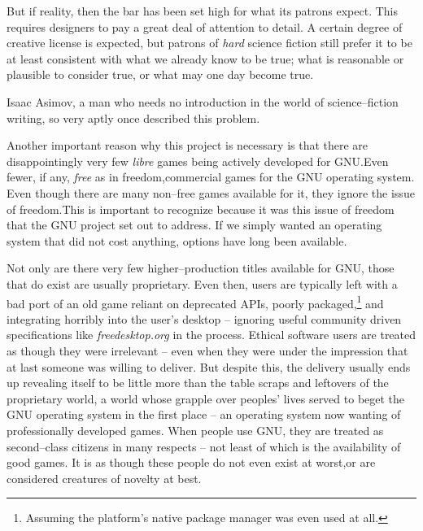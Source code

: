 But if reality, then the bar has been set high for what its patrons expect. This requires designers to pay a great deal of attention to detail. A certain degree of creative license is expected, but patrons of {\it hard} science fiction still prefer it to be at least consistent with what we already know to be true; what is reasonable or plausible to consider true, or what may one day become true.

Isaac Asimov, a man who needs no introduction in the world of science--fiction writing, so very aptly once described this problem. \footnotecite[extras={, p.~73.}][asimov1981]

Another important reason why this project is necessary is that there are disappointingly very few {\it libre} games being actively developed for GNU. Even fewer, if any, {\it free} as in freedom, commercial games for the GNU operating system. Even though there are many non--free games available for it, they ignore the issue of freedom. This is important to recognize because it was this issue of freedom that the GNU project set out to address. If we simply wanted an operating system that did not cost anything, options have long been available.\footnotecite[piratebay]

Not only are there very few higher--production titles available for GNU, those that do exist are usually proprietary. Even then, users are typically left with a bad port of an old game reliant on deprecated APIs, poorly packaged,\footnote{Assuming the platform's native package manager was even used at all.} and integrating horribly into the user's desktop -- ignoring useful community driven specifications like {\it freedesktop.org} in the process. Ethical software users are treated as though they were irrelevant -- even when they were under the impression that at last someone was willing to deliver. But despite this, the delivery usually ends up revealing itself to be little more than the table scraps and leftovers of the proprietary world, a world whose grapple over peoples' lives served to beget the GNU operating system in the first place -- an operating system now wanting of professionally developed games. When people use GNU, they are treated as second--class citizens in many respects -- not least of which is the availability of good games. It is as though these people do not even exist at worst, or are considered creatures of novelty at best. 

